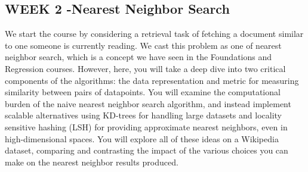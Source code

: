 \subsection{WEEK 2 -Nearest Neighbor Search}
We start the course by considering a retrieval task of fetching a document similar to one someone is currently reading. We cast this problem as one of nearest neighbor search, which is a concept we have seen in the Foundations and Regression courses. However, here, you will take a deep dive into two critical components of the algorithms: the data representation and metric for measuring similarity between pairs of datapoints. You will examine the computational burden of the naive nearest neighbor search algorithm, and instead implement scalable alternatives using KD-trees for handling large datasets and locality sensitive hashing (LSH) for providing approximate nearest neighbors, even in high-dimensional spaces. You will explore all of these ideas on a Wikipedia dataset, comparing and contrasting the impact of the various choices you can make on the nearest neighbor results produced.
